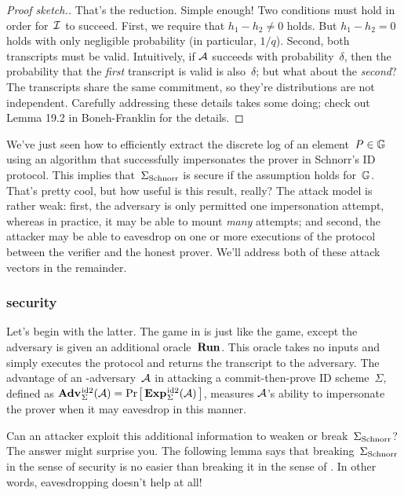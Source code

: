 \documentclass{article}
\theoremstyle{remark}
\begin{document}
\begin{proof}[Proof sketch.]
  That's the reduction. Simple enough! Two conditions must hold in order
  for~$\mathcal{I}$ to succeed. First, we require that $h_1-h_2\ne0$ holds. But
  $h_1-h_2=0$ holds with only negligible probability (in particular, $1/q$).
  Second, both transcripts must be valid. Intuitively, if $\mathcal{A}$ succeeds with
  probability~$\delta$, then the probability that the \emph{first} transcript is
  valid is also~$\delta$; but what about the \emph{second}? The transcripts
  share the same commitment, so they're distributions are not independent.
  Carefully addressing these details takes some doing; check out Lemma 19.2 in
  Boneh-Franklin for the details.
\end{proof}

We've just seen how to efficiently extract the discrete log of an
element~$P\in\mathbb{G}$ using an algorithm that successfully impersonates the prover in
Schnorr's ID protocol.  This implies that~${\Sigma_{\mathrm{Schnorr}}}$ is  secure if the \dl
assumption holds for~$\mathbb{G}$.
%
That's pretty cool, but how useful is this result, really? The  attack model
is rather weak: first, the adversary is only permitted one impersonation
attempt, whereas in practice, it may be able to mount \emph{many} attempts; and
second, the attacker may be able to eavesdrop on one or more executions of
the protocol between the verifier and the honest prover. We'll address both of
these attack vectors in the remainder.

\subsubsection{ security}
Let's begin with the latter. The  game in  is just like the 
game, except the adversary is given an additional oracle~$\textup{\textbf{Run}}\hspace{0.5pt}$. This oracle
takes no inputs and simply executes the protocol and returns the transcript to
the adversary. The advantage of an -adversary~$\mathcal{A}$ in attacking a
commit-then-prove ID scheme~$\Sigma$, defined as
$\Adv{\id2}_{\Sigma}(\A)=\Prob{\Exp{\id2}_{\Sigma}(\A)}$, measures $\mathcal{A}$'s
ability to impersonate the prover when it may eavesdrop in this manner.

Can an attacker exploit this additional information to weaken or
break~${\Sigma_{\mathrm{Schnorr}}}$? The answer might surprise you. The following lemma says that
breaking~${\Sigma_{\mathrm{Schnorr}}}$ in the sense of  security is no easier than breaking it
in the sense of .  In other words, eavesdropping doesn't help at all!
\end{document}
